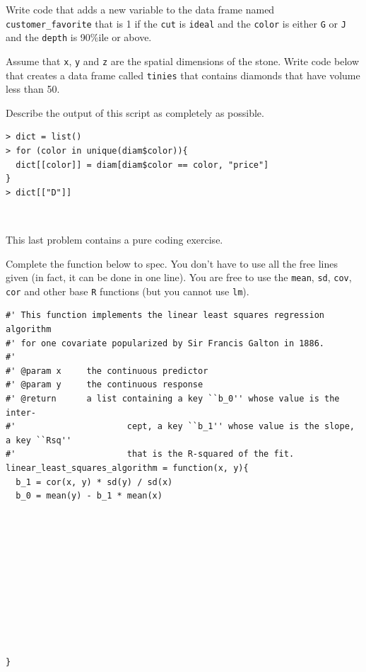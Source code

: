 \documentclass[12pt]{article}
\begin{document}
 Write code that adds a new variable to the data frame named \texttt{customer\_favorite} that is 1 if the \texttt{cut} is \texttt{ideal} and the \texttt{color} is either \texttt{G} or \texttt{J} and the \texttt{depth} is 90\%ile or above. 

 Assume that \texttt{x}, \texttt{y} and \texttt{z} are the spatial dimensions of the stone. Write code below that creates a data frame called \texttt{tinies} that contains diamonds that have volume less than 50. 

 Describe the output of this script as completely as possible.

\begin{lstlisting}
> dict = list()
> for (color in unique(diam$color)){
  dict[[color]] = diam[diam$color == color, "price"]
}
> dict[["D"]]
\end{lstlisting}~

\eenum


\problem This last problem contains a pure coding exercise. 

\benum

 Complete the function below to spec. You don't have to use all the free lines given (in fact, it can be done in one line). You are free to use the \texttt{mean}, \texttt{sd}, \texttt{cov}, \texttt{cor} and other base \texttt{R} functions (but you cannot use \texttt{lm}). 

\begin{lstlisting}
#' This function implements the linear least squares regression algorithm
#' for one covariate popularized by Sir Francis Galton in 1886.
#'
#' @param x		the continuous predictor
#' @param y		the continuous response 	
#' @return 		a list containing a key ``b_0'' whose value is the inter-
#'						cept, a key ``b_1'' whose value is the slope, a key ``Rsq''
#'						that is the R-squared of the fit.
linear_least_squares_algorithm = function(x, y){
  b_1 = cor(x, y) * sd(y) / sd(x)
  b_0 = mean(y) - b_1 * mean(x)











}
\end{lstlisting}

\eenum
\end{document}
